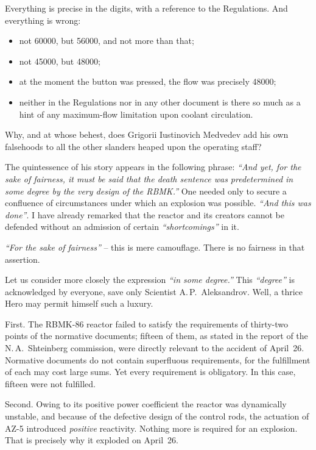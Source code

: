 \documentclass[openright]{bookest}
\begin{document}
Everything is precise in the digits, with a reference to the Regulations. And everything is wrong:

\begin{itemize}
  \item not \num{60000}, but \num{56000}, and not more than that;
  \item not \num{45000}, but \num{48000};
  \item at the moment the button was pressed, the flow was precisely \num{48000};
  \item neither in the Regulations nor in any other document is there so much as a hint of any maximum-flow limitation upon coolant circulation.
\end{itemize}

Why, and at whose behest, does Grigorii Iustinovich Medvedev add his own falsehoods to all the other slanders heaped upon the operating staff?

The quintessence of his story appears in the following phrase: \textit{``And yet, for the sake of fairness, it must be said that the death sentence was predetermined in some degree by the very design of the RBMK.''} One needed only to secure a confluence of circumstances under which an explosion was possible. \textit{``And this was done''}. I have already remarked that the reactor and its creators cannot be defended without an admission of certain \textit{``shortcomings''} in it.

\textit{``For the sake of fairness''} -- this is mere camouflage. There is no fairness in that assertion.

Let us consider more closely the expression \textit{``in some degree.''} This  \textit{``degree''} is acknowledged by everyone, save only Scientist A.\,P.~Aleksandrov. Well, a thrice Hero may permit himself such a luxury.

First. The RBMK-86 reactor failed to satisfy the requirements of thirty-two points of the normative documents; fifteen of them, as stated in the report of the N.\,A.~Shteinberg commission, were directly relevant to the accident of April~26. Normative documents do not contain superfluous requirements, for the fulfillment of each may cost large sums. Yet every requirement is obligatory. In this case, fifteen were not fulfilled.

Second. Owing to its positive power coefficient the reactor was dynamically unstable, and because of the defective design of the control rods, the actuation of AZ-5 introduced \textit{positive} reactivity. Nothing more is required for an explosion. That is precisely why it exploded on April~26.
\end{document}

